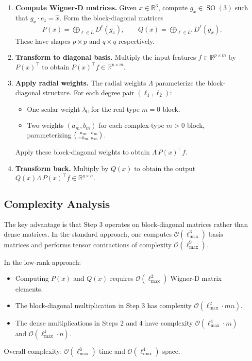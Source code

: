 \documentclass[a4paper, 12pt]{article}
\newcommand{\R}{\mathbb{R}}
\newcommand{\SO}{\operatorname{SO}(3)}
\newcommand{\lmax}{\ell_{\text{max}}}
\theoremstyle{definition}
\begin{document}
\begin{enumerate}
	\item \textbf{Compute Wigner-D matrices.} Given $x \in \R^3$, compute $g_x \in \SO$ such that $g_x \cdot e_z = \hat{x}$. Form the block-diagonal matrices
	\begin{align*}
		P(x) = \bigoplus_{\ell \in L} D^{\ell}(g_x), \qquad Q(x) = \bigoplus_{\ell \in L'} D^{\ell}(g_x).
	\end{align*}
	These have shapes $p \times p$ and $q \times q$ respectively.

	\item \textbf{Transform to diagonal basis.} Multiply the input features $f \in \R^{p \times m}$ by $P(x)^{\top}$ to obtain $P(x)^{\top} f \in \R^{p \times m}$.

	\item \textbf{Apply radial weights.} The radial weights $\Lambda$ parameterize the block-diagonal structure. For each degree pair $(\ell_1, \ell_2)$:
	\begin{itemize}
		\item One scalar weight $\lambda_0$ for the real-type $m = 0$ block.
		\item Two weights $(a_m, b_m)$ for each complex-type $m > 0$ block, parameterizing
		$\begin{psmallmatrix} a_m & b_m \\ -b_m & a_m \end{psmallmatrix}$.
	\end{itemize}
	Apply these block-diagonal weights to obtain $\Lambda \, P(x)^{\top} f$.

	\item \textbf{Transform back.} Multiply by $Q(x)$ to obtain the output $Q(x) \Lambda \, P(x)^{\top} f \in \R^{q \times n}$.
\end{enumerate}

\subsection{Complexity Analysis}

The key advantage is that Step 3 operates on block-diagonal matrices rather than dense matrices. In the standard approach, one computes $\mathcal{O}(\lmax^3)$ basis matrices and performs tensor contractions of complexity $\mathcal{O}(\lmax^9)$.

In the low-rank approach:
\begin{itemize}
	\item Computing $P(x)$ and $Q(x)$ requires $\mathcal{O}(\lmax^2)$ Wigner-D matrix elements.
	\item The block-diagonal multiplication in Step 3 has complexity $\mathcal{O}(\lmax^2 \cdot mn)$.
	\item The dense multiplications in Steps 2 and 4 have complexity $\mathcal{O}(\lmax^4 \cdot m)$ and $\mathcal{O}(\lmax^4 \cdot n)$.
\end{itemize}
Overall complexity: $\mathcal{O}(\lmax^6)$ time and $\mathcal{O}(\lmax^4)$ space.
\end{document}
